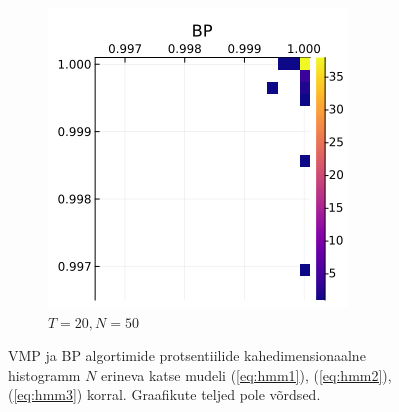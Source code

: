 \begin{figure}
\begin{subfigure}{.5\textwidth}
  \includegraphics[width=1\linewidth]{uniform_dirichlet_percs_std125_t20.png}
  \caption{$T = 20, N = 50$}
  \label{fig:sub2}
\end{subfigure}
\caption{VMP ja BP algortimide protsentiilide kahedimensionaalne histogramm $N$ erineva katse mudeli (\ref{eq:hmm1}), (\ref{eq:hmm2}), (\ref{eq:hmm3}) korral. Graafikute teljed pole võrdsed.}
\label{fig:test}
\end{figure}

